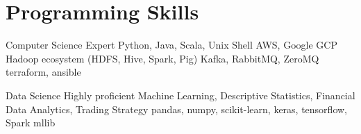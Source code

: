 \section{Programming Skills}

  \resumeSubHeadingListStart
    \resumeSubheading
      {Computer Science}{}
      {Expert}{}
      \resumeItemListStart
           {Python, Java, Scala, Unix Shell}
           {AWS, Google GCP}
           {Hadoop ecosystem (HDFS, Hive, Spark, Pig)}
           {Kafka, RabbitMQ, ZeroMQ}
           {terraform, ansible}
      \resumeItemListEnd
    
    \resumeSubheading
      {Data Science}{}
      {Highly proficient}{}
      \resumeItemListStart
           {Machine Learning, Descriptive Statistics, Financial Data Analytics, Trading Strategy}
           {pandas, numpy, scikit-learn, keras, tensorflow, Spark mllib}
      \resumeItemListEnd 
  \resumeSubHeadingListEnd